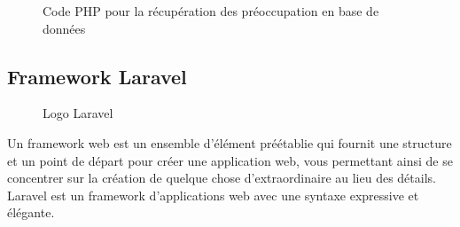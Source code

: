  \begin{figure}[H]%
    \center%
    \setlength{\fboxsep}{5pt}%
    \setlength{\fboxrule}{0.5pt}%
    \caption{Code PHP pour la récupération des préoccupation en base de données}%
\end{figure}

\subsection{Framework Laravel}

\begin{figure}[H]%
    \center%
    \setlength{\fboxsep}{5pt}%
    \setlength{\fboxrule}{0.5pt}%
    \caption{Logo Laravel}%
\end{figure}

  Un framework web est un ensemble d'élément préétablie qui fournit une structure et un point de départ pour créer une application web, vous permettant ainsi de se concentrer sur la création de quelque chose d'extraordinaire au lieu des détails.
Laravel est un framework d'applications web avec une syntaxe expressive et élégante\cite{laravelinfo}.
\newpage
